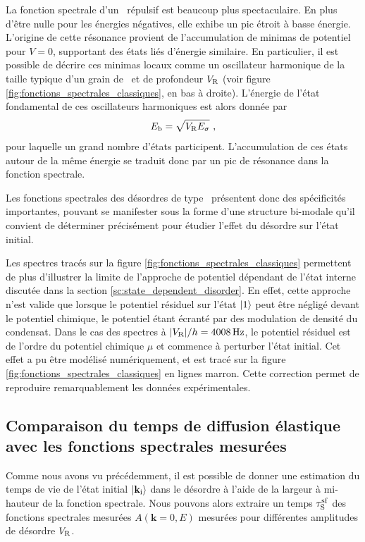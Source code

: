 La fonction spectrale d'un \speckle\ répulsif est beaucoup plus spectaculaire. En plus d'être nulle pour les énergies négatives, elle exhibe un pic étroit à basse énergie. L'origine de cette résonance provient de l'accumulation de minimas de potentiel pour $V=0$, supportant des états liés d'énergie similaire\citep{prat2016semiclassical}. En particulier, il est possible de décrire ces minimas locaux comme un oscillateur harmonique de la taille typique d'un grain de \speckle\ et de profondeur $V_{\mathrm{R}}$ (voir figure \ref{fig:fonctions_spectrales_classiques}, en bas à droite). L'énergie de l'état fondamental de ces oscillateurs harmoniques est alors donnée par 
\begin{equation}
E_{\mathrm{b}}=\sqrt{V_{\mathrm{R}}E_{\sigma}} \text{ ,}
\end{equation}
pour laquelle un grand nombre d'états participent. L'accumulation de ces états autour de la même énergie se traduit donc par un pic de résonance dans la fonction spectrale. 

Les fonctions spectrales des désordres de type \speckle\ présentent donc des spécificités importantes, pouvant se manifester sous la forme d'une structure bi-modale qu'il convient de déterminer précisément pour étudier l'effet du désordre sur l'état initial. 

Les spectres tracés sur la figure \ref{fig:fonctions_spectrales_classiques} permettent de plus d'illustrer la limite de l'approche de potentiel dépendant de l'état interne discutée dans la section \ref{sc:state_dependent_disorder}. En effet, cette approche n'est valide que lorsque le potentiel résiduel sur l'état $\left| 1 \right\rangle$ peut être négligé devant le potentiel chimique, le potentiel étant écranté par des modulation de densité du condensat. Dans le cas des spectres à $|V_{\mathrm{R}}|/h=\SI{4008}{\hertz}$, le potentiel résiduel est de l'ordre du potentiel chimique $\mu$ et commence à perturber l'état initial. Cet effet a pu être modélisé numériquement, et est tracé sur la figure \ref{fig:fonctions_spectrales_classiques} en lignes marron. Cette correction permet de reproduire remarquablement les données expérimentales.


\subsection{Comparaison du temps de diffusion élastique avec les fonctions spectrales mesurées}
Comme nous avons vu précédemment, il est possible de donner une estimation du temps de vie de l'état initial $\left| \mathbf{k}_{\mathrm{i}} \right\rangle$ dans le désordre à l'aide de la largeur à mi-hauteur de la fonction spectrale. Nous pouvons alors extraire un temps $\tau_{\mathrm{S}}^{\mathrm{sf}}$ des fonctions spectrales mesurées $A(\mathbf{k}=0,E)$ mesurées pour différentes amplitudes de désordre $V_{\mathrm{R}}$.

